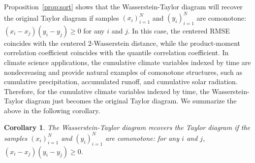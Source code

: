 \documentclass{amsart}
\numberwithin{equation}{section}
\theoremstyle{plain}
\newtheorem{corollary}[subsection]{Corollary}
\theoremstyle{definition}
\begin{document}
Proposition~\ref{prop:sort} shows that the Wasserstein-Taylor diagram will recover the original Taylor diagram if samples $(x_i)_{i=1}^N$ and $(y_i)_{i=1}^N$ are comonotone: $(x_i-x_j)(y_i-y_j) \geq 0$ for any $i$ and $j$. In this case, the centered RMSE coincides with the centered $2$-Wasserstein distance, while the product-moment correlation coefficient coincides with the quantile correlation coefficient.
In climate science applications, the cumulative climate variables indexed by time are nondecreasing and provide natural examples of comonotone structures, such as cumulative precipitation, accumulated runoff, and cumulative solar radiation. 
Therefore, for the cumulative climate variables indexed by time, the Wasserstein-Taylor diagram just becomes the original Taylor diagram. We summarize the above in the following corollary. 

\begin{corollary}\label{WTaylorAsTayloe}
    The Wasserstein-Taylor diagram recovers the Taylor diagram if the samples $(x_i)_{i=1}^N$ and $(y_i)_{i=1}^N$ are comonotone: for any $i$ and $j$, $(x_i-x_j)(y_i-y_j) \geq 0.$ 
\end{corollary}
\end{document}
